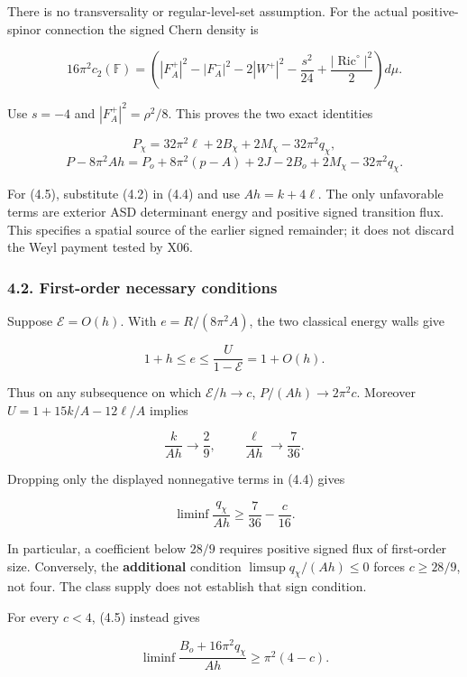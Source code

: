 \documentclass[
  11pt,
]{article}
\begin{document}
There is no transversality or regular-level-set assumption. For the
actual positive-spinor connection the signed Chern density is

\[
 16\pi^2c_2(\mathbb F)=
 \left(|F_A^+|^2-|F_A^-|^2-2|W^+|^2
             -\frac{s^2}{24}+\frac{|\operatorname{Ric}^{\circ}|^2}{2}\right)d\mu.
\]

Use \(s=-4\) and \(|F_A^+|^2=\rho^2/8\). This proves the two exact
identities

\[
 \boxed{P_\chi=32\pi^2\ell+2B_\chi+2M_\chi-32\pi^2q_\chi,}
 \tag{4.4}
\] \[
 \boxed{P-8\pi^2Ah=P_o+8\pi^2(p-A)+2J-2B_o
                              +2M_\chi-32\pi^2q_\chi.}
 \tag{4.5}
\]

For (4.5), substitute (4.2) in (4.4) and use \(Ah=k+4\ell\). The only
unfavorable terms are exterior ASD determinant energy and positive
signed transition flux. This specifies a spatial source of the earlier
signed remainder; it does not discard the Weyl payment tested by X06.

\hypertarget{first-order-necessary-conditions}{%
\subsubsection{4.2. First-order necessary
conditions}\label{first-order-necessary-conditions}}

Suppose \(\mathcal E=O(h)\). With \(e=R/(8\pi^2A)\), the two classical
energy walls give

\[
 1+h\le e\le\frac{U}{1-\mathcal E}=1+O(h).
\]

Thus on any subsequence on which \(\mathcal E/h\to c\),
\(P/(Ah)\to2\pi^2c\). Moreover \(U=1+15k/A-12\ell/A\) implies

\[
 \frac{k}{Ah}\to\frac29,\qquad
 \frac{\ell}{Ah}\to\frac7{36}.
 \tag{4.6}
\]

Dropping only the displayed nonnegative terms in (4.4) gives

\[
 \boxed{\liminf\frac{q_\chi}{Ah}
                         \ge\frac7{36}-\frac c{16}.}
 \tag{4.7}
\]

In particular, a coefficient below \(28/9\) requires positive signed
flux of first-order size. Conversely, the \textbf{additional} condition
\(\limsup q_\chi/(Ah)\le0\) forces \(c\ge28/9\), not four. The class
supply does not establish that sign condition.

For every \(c<4\), (4.5) instead gives

\[
 \boxed{\liminf\frac{B_o+16\pi^2q_\chi}{Ah}
                                      \ge\pi^2(4-c).}
 \tag{4.8}
\]
\end{document}
